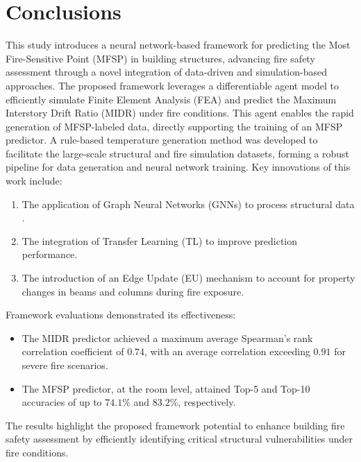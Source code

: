\section{Conclusions}
\label{sec:conclusion_future}

This study introduces a neural network-based framework for predicting the Most Fire-Sensitive Point (MFSP) in building structures, advancing fire safety assessment through a novel integration of data-driven and simulation-based approaches. The proposed framework leverages a differentiable agent model to efficiently simulate Finite Element Analysis (FEA) and predict the Maximum Interstory Drift Ratio (MIDR) under fire conditions. This agent enables the rapid generation of MFSP-labeled data, directly supporting the training of an MFSP predictor. A rule-based temperature generation method was developed to facilitate the large-scale structural and fire simulation datasets, forming a robust pipeline for data generation and neural network training. Key innovations of this work include: 
\begin{enumerate}
    \item The application of Graph Neural Networks (GNNs) to process structural data .
    \item The integration of Transfer Learning (TL) to improve prediction performance.
    \item The introduction of an Edge Update (EU) mechanism to account for property changes in beams and columns during fire exposure. 
\end{enumerate}
Framework evaluations demonstrated its effectiveness: 
\begin{itemize}
\item The MIDR predictor achieved a maximum average Spearman's rank correlation coefficient of $0.74$, with an average correlation exceeding $0.91$ for severe fire scenarios.
\item The MFSP predictor, at the room level, attained Top-5 and Top-10 accuracies of up to $74.1\%$ and $83.2\%$, respectively.
\end{itemize}
The results highlight the proposed framework potential to enhance building fire safety assessment by efficiently identifying critical structural vulnerabilities under fire conditions.
